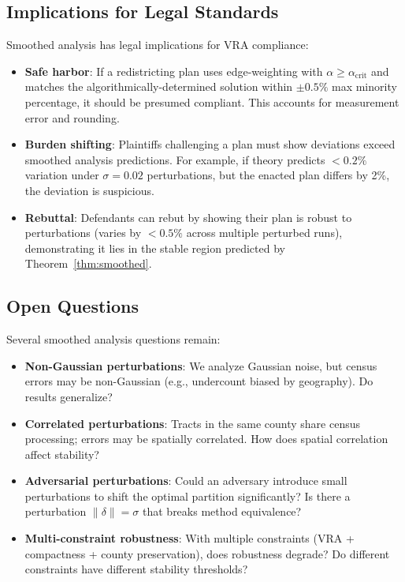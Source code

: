 \subsection{Implications for Legal Standards}

Smoothed analysis has legal implications for VRA compliance:

\begin{itemize}
    \item \textbf{Safe harbor}: If a redistricting plan uses edge-weighting with $\alpha \geq \alpha_{\text{crit}}$ and matches the algorithmically-determined solution within $\pm 0.5\%$ max minority percentage, it should be presumed compliant. This accounts for measurement error and rounding.

    \item \textbf{Burden shifting}: Plaintiffs challenging a plan must show deviations exceed smoothed analysis predictions. For example, if theory predicts $< 0.2\%$ variation under $\sigma = 0.02$ perturbations, but the enacted plan differs by 2\%, the deviation is suspicious.

    \item \textbf{Rebuttal}: Defendants can rebut by showing their plan is robust to perturbations (varies by $< 0.5\%$ across multiple perturbed runs), demonstrating it lies in the stable region predicted by Theorem~\ref{thm:smoothed}.
\end{itemize}

\subsection{Open Questions}

Several smoothed analysis questions remain:

\begin{itemize}
    \item \textbf{Non-Gaussian perturbations}: We analyze Gaussian noise, but census errors may be non-Gaussian (e.g., undercount biased by geography). Do results generalize?

    \item \textbf{Correlated perturbations}: Tracts in the same county share census processing; errors may be spatially correlated. How does spatial correlation affect stability?

    \item \textbf{Adversarial perturbations}: Could an adversary introduce small perturbations to shift the optimal partition significantly? Is there a perturbation $\|\delta\| = \sigma$ that breaks method equivalence?

    \item \textbf{Multi-constraint robustness}: With multiple constraints (VRA + compactness + county preservation), does robustness degrade? Do different constraints have different stability thresholds?
\end{itemize}

